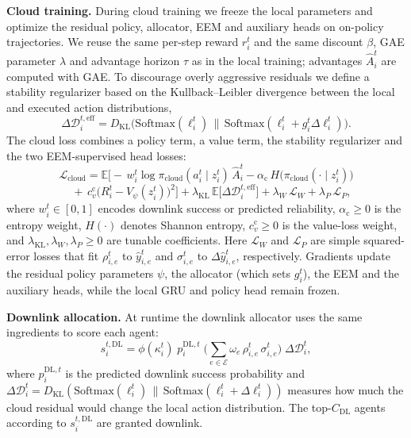 \documentclass[conference]{IEEEtran}
\begin{document}
\textbf{Cloud training.}
During cloud training we freeze the local parameters and optimize the residual
policy, allocator, EEM and auxiliary heads on on-policy trajectories.
We reuse the same per-step reward $r_i^t$ and the same discount $\beta$,
GAE parameter $\lambda$ and advantage horizon $\tau$ as in the local training;
advantages $\hat A_i^t$ are computed with GAE.
To discourage overly aggressive residuals we define a stability regularizer
based on the Kullback–Leibler divergence between the local and executed action
distributions,
\begin{equation}
\Delta\mathcal D_i^{t,\mathrm{eff}}
= D_{\mathrm{KL}}\!\Big(\mathrm{Softmax}(\ell_i^t)\,\big\|\,
\mathrm{Softmax}(\ell_i^t+g_i^t\Delta\ell_i^t)\Big).
\end{equation}
The cloud loss combines a policy term, a value term, the stability regularizer
and the two EEM-supervised head losses:
\begin{equation*}
\mathcal L_{\mathrm{cloud}}
= \mathbb E\Big[-\,w_i^t\log \pi_{\mathrm{cloud}}(a_i^t\mid z_i^t)\,\hat A_i^t
-\alpha_{\mathrm c}\,H\big(\pi_{\mathrm{cloud}}(\cdot\mid z_i^t)\big)
\end{equation*}
\begin{equation*}
\quad +\,c_v^{\mathrm c}\big(R_i^t - V_{\psi}(z_i^t)\big)^2\Big]
+ \lambda_{\mathrm{KL}}\,\mathbb E\big[\Delta\mathcal D_i^{t,\mathrm{eff}}\big]
+ \lambda_W\,\mathcal L_W + \lambda_P\,\mathcal L_P,
\end{equation*}
where $w_i^t\in[0,1]$ encodes downlink success or predicted reliability,
$\alpha_{\mathrm c}\!\ge\!0$ is the entropy weight,
$H(\cdot)$ denotes Shannon entropy, $c_v^{\mathrm c}\!\ge\!0$ is the
value-loss weight, and $\lambda_{\mathrm{KL}},\lambda_W,\lambda_P\!\ge\!0$ are
tunable coefficients.
Here $\mathcal L_W$ and $\mathcal L_P$ are simple squared-error losses that
fit $\rho_{i,e}^t$ to $\hat y_{i,e}^t$ and $\sigma_{i,e}^t$ to
$\Delta\hat y_{i,e}^t$, respectively.
Gradients update the residual policy parameters $\psi$, the allocator (which
sets $g_i^t$), the EEM and the auxiliary heads, while the local GRU and policy
head remain frozen.

\textbf{Downlink allocation.}
At runtime the downlink allocator uses the same ingredients to score each
agent:
\begin{equation}
s_i^{t,\mathrm{DL}}
=\phi(\kappa_i^t)\; p_i^{\mathrm{DL},t}\;
\Big(\textstyle\sum_{e\in\mathcal E}\omega_e\,\rho_{i,e}^t\,\sigma_{i,e}^t\Big)\;
\Delta\mathcal D_i^t,
\end{equation}
where $p_i^{\mathrm{DL},t}$ is the predicted downlink success probability and
$\Delta\mathcal D_i^t = D_{\mathrm{KL}}(\mathrm{Softmax}(\ell_i^t)\,\|\,
\mathrm{Softmax}(\ell_i^t+\Delta\ell_i^t))$ measures how much the cloud
residual would change the local action distribution.
The top-$C_{\mathrm{DL}}$ agents according to $s_i^{t,\mathrm{DL}}$ are granted
downlink.
\end{document}
